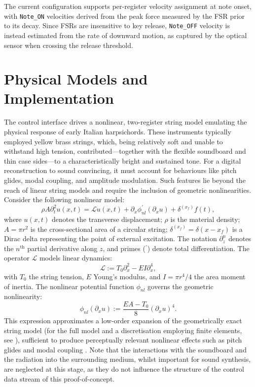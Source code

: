 The current configuration supports per-register velocity assignment at note onset, with \texttt{Note\_ON} velocities derived from the peak force measured by the FSR prior to its decay. Since FSRs are insensitive to key release, \texttt{Note\_OFF} velocity is instead estimated from the rate of downward motion, as captured by the optical sensor when crossing the release threshold.



\section{Physical Models and Implementation}

The control interface drives a nonlinear, two-register string model emulating the physical response of early Italian harpsichords. These instruments typically employed yellow brass strings, which, being relatively soft and unable to withstand high tension, contributed—together with the flexible soundboard and thin case sides—to a characteristically bright and sustained tone. For a digital reconstruction to sound convincing, it must account for behaviours like pitch glides, modal coupling, and amplitude modulation. Such features lie beyond the reach of linear string models and require the inclusion of geometric nonlinearities. Consider the following nonlinear model:
\begin{equation}\label{eq:CntModel}
\rho A \partial_t^2 u(x,t) = \mathcal L u(x,t) + \partial_x\phi^\prime_{nl}(\partial_x u) + \delta^{(x_f)}f(t),
\end{equation}
where $u(x,t)$ denotes the transverse displacement; $\rho$ is the material density; $A = \pi r^2$ is the cross-sectional area of a circular string; $\delta^{(x_f)} = \delta(x - x_f)$ is a Dirac delta representing the point of external excitation. The notation $\partial_z^n$ denotes the $n^{\text{th}}$ partial derivative along $z$, and primes ($^\prime$) denote total differentiation. 
The operator $\mathcal L$ models linear dynamics:
\begin{equation}
\mathcal L := T_0 \partial_x^2 - EI \partial_x^4,
\end{equation}
with $T_0$ the string tension, $E$ Young’s modulus, and $I = \pi r^4/4$ the area moment of inertia. The nonlinear potential function $\phi_{nl}$ governs the geometric nonlinearity:
\begin{equation}\label{eq:phiNL}
\phi_{nl}(\partial_x u) := \frac{EA - T_0}{8} (\partial_x u)^4.
\end{equation}
This expression approximates a low-order expansion of the geometrically exact string model (for the full model and a discretisation employing finite elements, see \cite{chabassier2010energy}), sufficient to produce perceptually relevant nonlinear effects such as pitch glides and modal coupling \cite{russo2024scalar}. Note that the interactions with the soundboard and the radiation into the surrounding medium, whilst important for sound synthesis, are neglected at this stage, as they do not influence the structure of the control data stream of this proof-of-concept.

